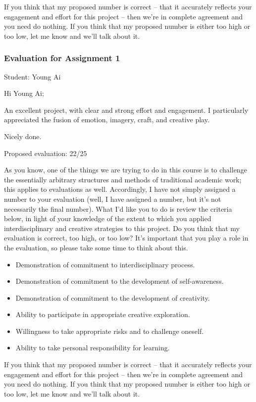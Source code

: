 \documentclass[letterpaper,10pt,DIV=9,headsepline]{scrreprt}
\begin{document}
If you think that my proposed number is correct -- that it accurately
reflects your engagement and effort for this project -- then we're in
complete agreement and you need do nothing. If you think that my
proposed number is either too high or too low, let me know and we'll
talk about it.

\newpage

\subsubsection{Evaluation for Assignment 1}

Student: Young Ai

\bigskip
Hi Young Ai;

An excellent project, with clear and strong effort and engagement. I
particularly appreciated the fusion of emotion, imagery, craft, and
creative play.

Nicely done.


\bigskip
Proposed evaluation: 22/25

\bigskip
As you know, one of the things we are trying to do in this course is
to challenge the essentially arbitrary structures and methods of
traditional academic work; this applies to evaluations as well.
Accordingly, I have not simply assigned a number to your evaluation
(well, I have assigned a number, but it's not necessarily the final
number). What I'd like you to do is review the criteria below, in
light of your knowledge of the extent to which you applied
interdisciplinary and creative strategies to this project. Do you
think that my evaluation is correct, too high, or too low? It's
important that you play a role in the evaluation, so please take some
time to think about this.

\begin{itemize}
\item Demonstration of commitment to interdisciplinary process.
\item Demonstration of commitment to the development of self-awareness.
\item Demonstration of commitment to the development of creativity.
\item Ability to participate in appropriate creative exploration.
\item Willingness to take appropriate risks and to challenge oneself.
\item Ability to take personal responsibility for learning.
\end{itemize}

If you think that my proposed number is correct -- that it accurately
reflects your engagement and effort for this project -- then we're in
complete agreement and you need do nothing. If you think that my
proposed number is either too high or too low, let me know and we'll
talk about it.
\end{document}
